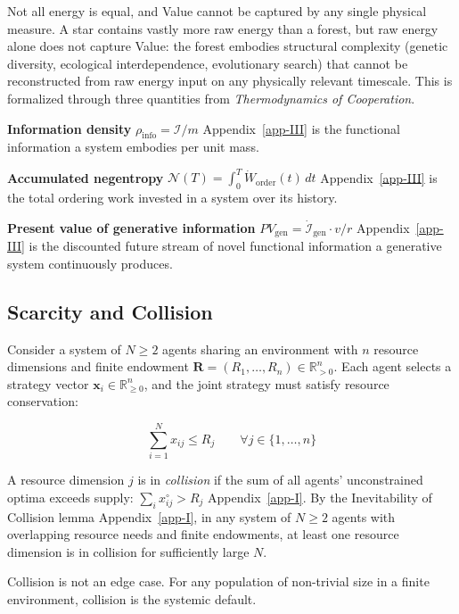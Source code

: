 \documentclass[11pt]{article}
\theoremstyle{plain}
\theoremstyle{definition}
\theoremstyle{remark}
\let\origsubsection\subsection
\renewcommand{\subsection}{\needspace{7\baselineskip}\origsubsection}
\begin{document}
Not all energy is equal, and Value cannot be captured by any single
physical measure. A star contains vastly more raw energy than a forest,
but raw energy alone does not capture Value: the forest embodies
structural complexity (genetic diversity, ecological interdependence,
evolutionary search) that cannot be reconstructed from raw energy input
on any physically relevant timescale. This is formalized through three
quantities from \emph{Thermodynamics of Cooperation}.

\textbf{Information density} \(\rho_{\text{info}} = \mathcal{I} / m\)
Appendix~\ref{app-III} is the functional information a system embodies
per unit mass.

\textbf{Accumulated negentropy}
\(\mathcal{N}(T) = \int_0^T \dot{W}_{\text{order}}(t)\,dt\)
Appendix~\ref{app-III} is the total ordering work invested in a system
over its history.

\textbf{Present value of generative information}
\(PV_{\text{gen}} = \dot{\mathcal{I}}_{\text{gen}} \cdot v / r\)
Appendix~\ref{app-III} is the discounted future stream of novel
functional information a generative system continuously produces.

\subsection{Scarcity and Collision}\label{scarcity-and-collision}

Consider a system of \(N \geq 2\) agents sharing an environment with
\(n\) resource dimensions and finite endowment
\(\mathbf{R} = (R_1, \ldots, R_n) \in \mathbb{R}_{>0}^n\). Each agent
selects a strategy vector \(\mathbf{x}_i \in \mathbb{R}_{\geq 0}^n\),
and the joint strategy must satisfy resource conservation:

\[\sum_{i=1}^{N} x_{ij} \leq R_j \qquad \forall j \in \{1, \ldots, n\}\]

A resource dimension \(j\) is in \emph{collision} if the sum of all
agents' unconstrained optima exceeds supply:
\(\sum_i x_{ij}^{\circ} > R_j\) Appendix~\ref{app-I}. By the
Inevitability of Collision lemma Appendix~\ref{app-I}, in any system of
\(N \geq 2\) agents with overlapping resource needs and finite
endowments, at least one resource dimension is in collision for
sufficiently large \(N\).

Collision is not an edge case. For any population of non-trivial size in
a finite environment, collision is the systemic default.
\end{document}
